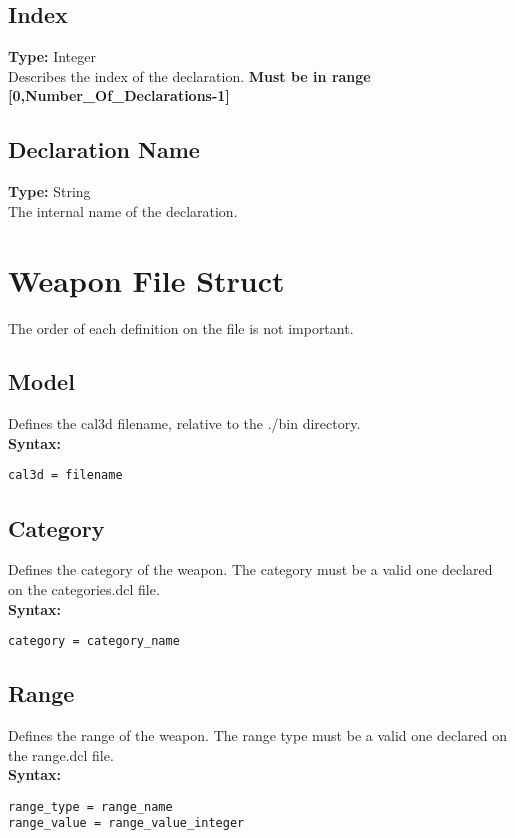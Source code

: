 \documentclass[letterpaper,12pt]{article}
\begin{document}
\subsection{Index}
{\bf Type: }Integer\\
Describes the index of the declaration. {\bf Must be in range
[0,Number\_Of\_Declarations-1]}

\subsection{Declaration Name}
{\bf Type: }String\\
The internal name of the declaration.

\section{Weapon File Struct}

The order of each definition on the file is not important. 

\subsection{Model}

Defines the cal3d filename, relative to the ./bin directory.\\

{\bf Syntax: }
\begin{verbatim}
cal3d = filename
\end{verbatim}

\subsection{Category}

Defines the category of the weapon. The category must be a valid one 
declared on the categories.dcl file.\\

{\bf Syntax: }
\begin{verbatim}
category = category_name
\end{verbatim}

\subsection{Range}

Defines the range of the weapon. The range type must be a valid one 
declared on the range.dcl file.\\

{\bf Syntax: }
\begin{verbatim}
range_type = range_name
range_value = range_value_integer
\end{verbatim}
\end{document}
